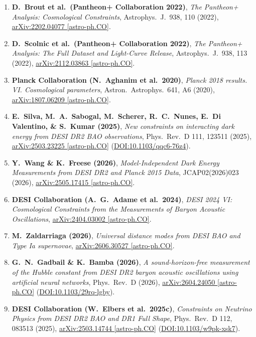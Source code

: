 \documentclass[11pt,letterpaper]{article}
\begin{document}
\begin{enumerate}
    \item \textbf{D.\ Brout et al.\ (Pantheon+ Collaboration 2022)}, \emph{The Pantheon+ Analysis: Cosmological Constraints}, Astrophys.\ J.\ 938, 110 (2022), \href{https://arxiv.org/abs/2202.04077}{arXiv:2202.04077 [astro-ph.CO]}.
    \item \textbf{D.\ Scolnic et al.\ (Pantheon+ Collaboration 2022)}, \emph{The Pantheon+ Analysis: The Full Dataset and Light-Curve Release}, Astrophys.\ J.\ 938, 113 (2022), \href{https://arxiv.org/abs/2112.03863}{arXiv:2112.03863 [astro-ph.CO]}.
    \item \textbf{Planck Collaboration (N.\ Aghanim et al.\ 2020)}, \emph{Planck 2018 results. VI. Cosmological parameters}, Astron.\ Astrophys.\ 641, A6 (2020), \href{https://arxiv.org/abs/1807.06209}{arXiv:1807.06209 [astro-ph.CO]}.
    \item \textbf{E.\ Silva, M.\ A.\ Sabogal, M.\ Scherer, R.\ C.\ Nunes, E.\ Di Valentino, \& S.\ Kumar (2025)}, \emph{New constraints on interacting dark energy from DESI DR2 BAO observations}, Phys.\ Rev.\ D 111, 123511 (2025), \href{https://arxiv.org/abs/2503.23225}{arXiv:2503.23225 [astro-ph.CO]} (\href{https://link.aps.org/doi/10.1103/qqc6-76z4}{DOI:10.1103/qqc6-76z4}).
    \item \textbf{Y.\ Wang \& K.\ Freese (2026)}, \emph{Model-Independent Dark Energy Measurements from DESI DR2 and Planck 2015 Data}, JCAP02(2026)023 (2026), \href{https://arxiv.org/abs/2505.17415}{arXiv:2505.17415 [astro-ph.CO]}.
    \item \textbf{DESI Collaboration (A.\ G.\ Adame et al.\ 2024)}, \emph{DESI 2024 VI: Cosmological Constraints from the Measurements of Baryon Acoustic Oscillations}, \href{https://arxiv.org/abs/2404.03002}{arXiv:2404.03002 [astro-ph.CO]}.
    \item \textbf{M.\ Zaldarriaga (2026)}, \emph{Universal distance modes from DESI BAO and Type Ia supernovae}, \href{https://arxiv.org/abs/2606.30527}{arXiv:2606.30527 [astro-ph.CO]}.
    \item \textbf{G.\ N.\ Gadbail \& K.\ Bamba (2026)}, \emph{A sound-horizon-free measurement of the Hubble constant from DESI DR2 baryon acoustic oscillations using artificial neural networks}, Phys.\ Rev.\ D (2026), \href{https://arxiv.org/abs/2604.24050}{arXiv:2604.24050 [astro-ph.CO]} (\href{https://link.aps.org/doi/10.1103/29rq-lgby}{DOI:10.1103/29rq-lgby}).
    \item \textbf{DESI Collaboration (W.\ Elbers et al.\ 2025c)}, \emph{Constraints on Neutrino Physics from DESI DR2 BAO and DR1 Full Shape}, Phys.\ Rev.\ D 112, 083513 (2025), \href{https://arxiv.org/abs/2503.14744}{arXiv:2503.14744 [astro-ph.CO]} (\href{https://link.aps.org/doi/10.1103/w9pk-xsk7}{DOI:10.1103/w9pk-xsk7}).

\end{enumerate}
\end{document}
